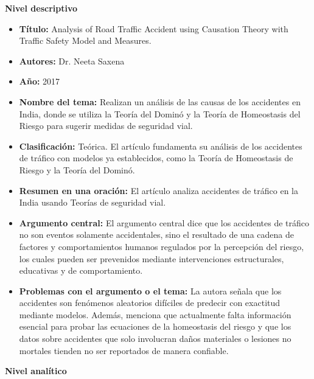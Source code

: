 \documentclass[12pt]{article}
\begin{document}
\textbf{Nivel descriptivo}
\begin{itemize}
    \item \textbf{Título:} Analysis of Road Traffic Accident using Causation Theory with Traffic Safety Model and Measures.
    
    \item \textbf{Autores:} Dr. Neeta Saxena 
    
    \item \textbf{Año:} 2017 
    
    \item \textbf{Nombre del tema:} Realizan un análisis de las causas de los accidentes en India, donde se utiliza la Teoría del Dominó y la Teoría de Homeostasis del Riesgo para sugerir medidas de seguridad vial.
    
    \item \textbf{Clasificación:} Teórica. El artículo fundamenta su análisis de los accidentes de tráfico con modelos ya establecidos, como la Teoría de Homeostasis de Riesgo y la Teoría del Dominó.
    
    \item \textbf{Resumen en una oración:} El artículo analiza accidentes de tráfico en la India usando Teorías de seguridad vial.
    
    \item \textbf{Argumento central:} El argumento central dice que los accidentes de tráfico no son eventos solamente accidentales, sino el resultado de una cadena de factores y comportamientos humanos regulados por la percepción del riesgo, los cuales pueden ser prevenidos mediante intervenciones estructurales, educativas y de comportamiento. 
    
    \item \textbf{Problemas con el argumento o el tema:} La autora señala que los accidentes son fenómenos aleatorios difíciles de predecir con exactitud mediante modelos. Además, menciona que actualmente falta información esencial para probar las ecuaciones de la homeostasis del riesgo y que los datos sobre accidentes que solo involucran daños materiales o lesiones no mortales tienden no ser reportados de manera confiable.  \\
\end{itemize}

\textbf{Nivel analítico}
\end{document}
